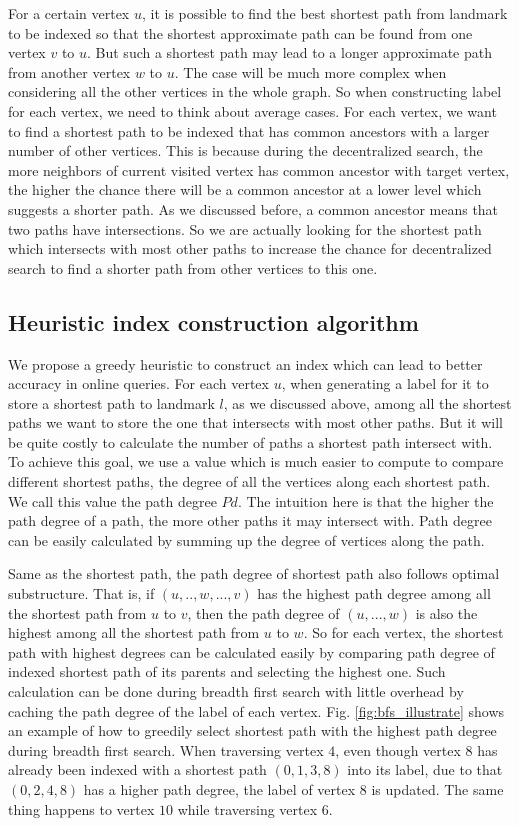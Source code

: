 For a certain vertex $u$, it is possible to find the best shortest path from landmark to be indexed so that the shortest approximate path can be found from one vertex $v$ to $u$. But such a shortest path may lead to a longer approximate path from another vertex $w$ to $u$. The case will be much more complex when considering all the other vertices in the whole graph. So when constructing label for each vertex, we need to think about average cases. For each vertex, we want to find a shortest path to be indexed that has common ancestors with a larger number of other vertices. This is because during the decentralized search, the more neighbors of current visited vertex has common ancestor with target vertex, the higher the chance there will be a common ancestor at a lower level which suggests a shorter path. As we discussed before, a common ancestor means that two paths have intersections. So we are actually looking for the shortest path which intersects with most other paths to increase the chance for decentralized search to find a shorter path from other vertices to this one.

\subsection{Heuristic index construction algorithm}

We propose a greedy heuristic to construct an index which can lead to better accuracy in online queries. For each vertex  $u$, when generating a label for it to store a shortest path to landmark $l$, as we discussed above, among all the shortest paths we want to store the one that intersects with most other paths. But it will be quite costly to calculate the number of paths a shortest path intersect with. To achieve this goal, we use a value which is much easier to compute to compare different shortest paths, the degree of all the vertices along each shortest path. We call this value the path degree $Pd$. The intuition here is that the higher the path degree of a path, the more other paths it may intersect with. Path degree can be easily calculated by summing up the degree of vertices along the path.

Same as the shortest path, the path degree of shortest path also follows optimal substructure. That is, if $(u, .., w, ..., v)$ has the highest path degree among all the shortest path from $u$ to $v$, then the path degree of $(u, ..., w)$ is also the highest among all the shortest path from $u$ to $w$. So for each vertex, the shortest path with highest degrees can be calculated easily by comparing path degree of indexed shortest path of its parents and selecting the highest one. Such calculation can be done during breadth first search with little overhead by caching the path degree of the label of each vertex. Fig. \ref{fig:bfs_illustrate} shows an example of how to greedily select shortest path with the highest path degree during breadth first search. When traversing vertex $4$, even though vertex $8$ has already been indexed with a shortest path $(0, 1, 3, 8)$ into its label, due to that $(0, 2, 4, 8)$ has a higher path degree, the label of vertex $8$ is updated. The same thing happens to vertex $10$ while traversing vertex $6$.

